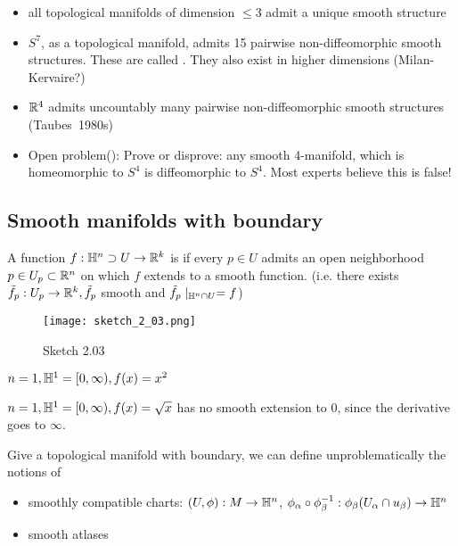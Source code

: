 \begin{remark}
    \begin{itemize}
        \item all topological manifolds of dimension \(\leq 3\) admit a unique smooth structure
        \item \(S^7\), as a topological manifold, admits 15 pairwise non-diffeomorphic smooth structures. These are called . They also exist 
            in higher dimensions (Milan-Kervaire?)
        \item \(\mathbb{R}^4\) admits uncountably many pairwise non-diffeomorphic smooth structures (Taubes~1980s)
        \item Open problem(): Prove or disprove: any smooth 
              4-manifold, which is homeomorphic to \(S^4\) is diffeomorphic to \(S^4\). Most experts believe this is false!  
    \end{itemize}
\end{remark}


\subsection{Smooth manifolds with boundary}

\begin{definition*}
    A function \(f:\mathbb{H}^n\supset U \to \mathbb{R}^k\) is  if every \(p\in U\)
    admits an open neighborhood \(p\in U_p\subset\mathbb{R}^n\) on which \(f\) extends to a smooth function. (i.e. there exists \(\tilde{f}_p:U_p\to\mathbb{R}^k,\tilde{f}_p\) smooth and \(\tilde{f}_p\mid_{\mathbb{H}^n\cap U}=f\))
\end{definition*}

\begin{figure}[H]
    \centering
    \texttt{[image: sketch\_2\_03.png]}
    \caption{Sketch 2.03}
\end{figure}

\begin{example}
    \(n=1,\mathbb{H}^1=[0,\infty), f(x)=x^2\)
\end{example}
\begin{example}
    \(n=1,\mathbb{H}^1=[0,\infty), f(x)=\sqrt{x}\) has no smooth extension to \(0\), since the derivative goes to \(\infty\).
\end{example}

Give a topological manifold with boundary, we can define unproblematically the notions of 
\begin{itemize}
    \item smoothly compatible charts: \((U,\phi):M\to\mathbb{H}^n\), \(\phi_\alpha\circ \phi_\beta^{-1}:\phi_\beta(U_\alpha\cap u_\beta)\to\mathbb{H}^n\)
    \item smooth atlases
\end{itemize}


